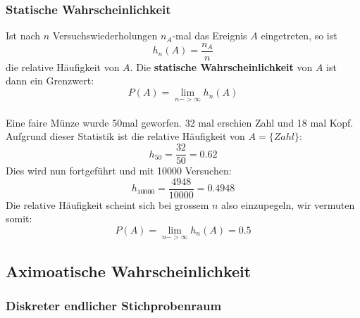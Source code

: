 \documentclass[12pt,a4paper]{article} %
\begin{document}
\pagebreak
\subsubsection{Statische Wahrscheinlichkeit}

Ist nach $n$ Versuchswiederholungen $n_A$-mal das Ereignis $A$ eingetreten, so ist
$$h_n(A) = \frac{n_A}{n}$$
die relative Häufigkeit von $A$. Die \textbf{statische Wahrscheinlichkeit} von $A$ ist dann ein Grenzwert:
$$P(A) = \lim_{n->\infty} h_n(A)$$
\\Eine faire Münze wurde 50mal geworfen. 32 mal erschien Zahl und 18 mal Kopf. Aufgrund dieser Statistik ist die relative Häufigkeit von $A = \{Zahl\}$:
$$h_{50} = \frac{32}{50}=0.62$$
Dies wird nun fortgeführt und mit 10000 Versuchen:
$$h_{10000} = \frac{4948}{10000} = 0.4948$$
Die relative Häufigkeit scheint sich bei grossem $n$ also einzupegeln, wir vermuten somit:
$$P(A) = \lim_{n->\infty} h_n(A) = 0.5$$

\subsection{Aximoatische Wahrscheinlichkeit}

\subsubsection{Diskreter endlicher Stichprobenraum}
\end{document}
